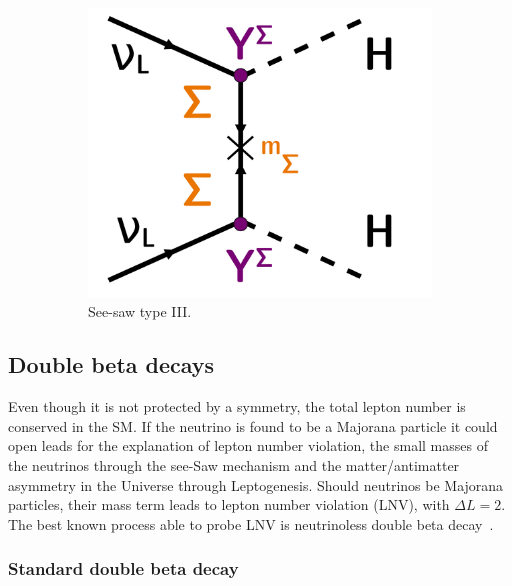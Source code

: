 \begin{figure}[h]
\begin{subfigure}[t]{0.32\textwidth}
    \centering
    \includegraphics[height=0.7\textwidth]{neutrinophysics/fig_neutrinophysics/seesaw_III.pdf}
    \captionsetup{justification=justified}
    \caption{See-saw type III.
      \label{subfig:diagram_seesawIII}}
  \end{subfigure}
  \caption{
    \label{fig:diagram_seesaws}
  }
\end{figure}



\subsection{Double beta decays}
\label{subsec:double_beta_decays}


Even though it is not protected by a symmetry, the total lepton number is conserved in the SM.
If the neutrino is found to be a Majorana particle it could open leads for the explanation of lepton number violation, the small masses of the neutrinos through the see-Saw mechanism and the matter/antimatter asymmetry in the Universe through Leptogenesis.
Should neutrinos be Majorana particles, their mass term leads to lepton number violation (LNV), with $\Delta L = 2$.
The best known process able to probe LNV is neutrinoless double beta decay~\cite{art:Drewes_2013}.



\subsubsection*{Standard double beta decay}

